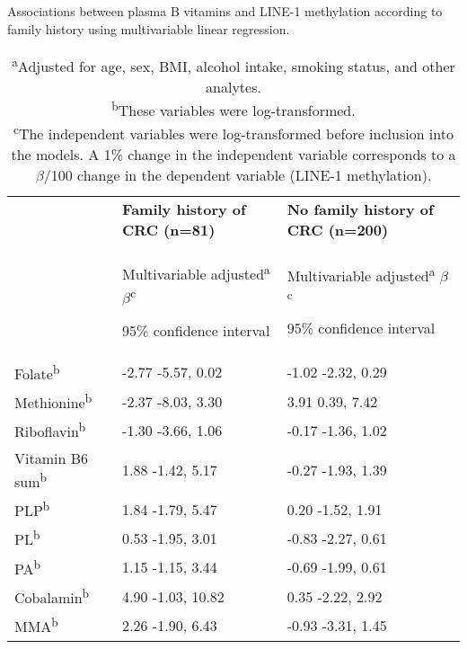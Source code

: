 \begin{table}
\small
\caption{Associations between plasma B vitamins and LINE-1 methylation according to family history using multivariable linear regression.}
\label{table5_3}
\begin{adjustbox}{width=\textwidth}
\begin{tabular}{L{2.5cm}C{5.0cm}C{5.0cm}}

\hline ~ & \bfseries Family history of CRC (n=81) & %
\bfseries No family history of CRC (n=200)\\
~ & { Multivariable adjusted\textsuperscript{a}} { $\beta $\textsuperscript{c}}

95\% confidence interval & { Multivariable adjusted\textsuperscript{a}} { $\beta $\textsuperscript{c}}

95\% confidence interval
\\
\hline
Folate\textsuperscript{b} & { {}-2.77} {}-5.57, 0.02 & { {}-1.02} {}-2.32, 0.29\\
Methionine\textsuperscript{b} & { {}-2.37} {}-8.03, 3.30 & { 3.91} 0.39, 7.42\\
Riboflavin\textsuperscript{b} & { {}-1.30} {}-3.66, 1.06 & { {}-0.17} {}-1.36, 1.02\\
Vitamin B6 sum\textsuperscript{b} & { 1.88} {}-1.42, 5.17 & { {}-0.27} {}-1.93, 1.39\\
PLP\textsuperscript{b} & { 1.84} {}-1.79, 5.47 & { 0.20} {}-1.52, 1.91\\
PL\textsuperscript{b} & { 0.53} {}-1.95, 3.01 & { {}-0.83} {}-2.27, 0.61\\
PA\textsuperscript{b} & { 1.15} {}-1.15, 3.44 & { {}-0.69} {}-1.99, 0.61\\
Cobalamin\textsuperscript{b} & { 4.90} {}-1.03, 10.82 & { 0.35} {}-2.22, 2.92\\
MMA\textsuperscript{b} & { 2.26} {}-1.90, 6.43 & { {}-0.93} {}-3.31, 1.45\\
\hline
\end{tabular}
\end{adjustbox}
\caption*{\footnotesize{\textsuperscript{a}Adjusted for age, sex, BMI, alcohol intake, smoking status, and other analytes.\\\textsuperscript{b}These variables were log-transformed.\\\textsuperscript{c}The independent variables were log-transformed before inclusion into the models. A 1\% change in the independent variable corresponds to a $\beta$/100 change in the dependent variable (LINE-1 methylation).}}
\end{table}

